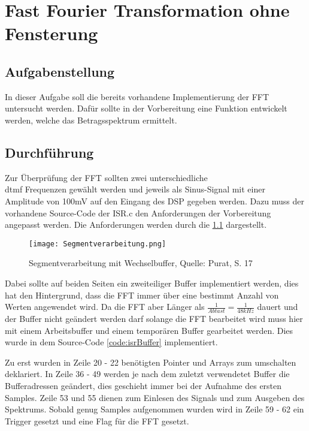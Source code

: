 \chapter{Fast Fourier Transformation ohne Fensterung}\label{CFFToF}
\section{Aufgabenstellung}\label{TFFToF}
In dieser Aufgabe soll die bereits vorhandene Implementierung der FFT untersucht werden. Dafür sollte in der Vorbereitung eine Funktion entwickelt werden, welche das Betragsspektrum ermittelt.

\section{Durchführung}\label{DFFToF}
Zur Überprüfung der FFT sollten zwei unterschiedliche\\ \gls{dtmf} Frequenzen gewählt werden und jeweils als Sinus-Signal mit einer Amplitude von 100mV auf den Eingang des DSP gegeben werden.
Dazu muss der vorhandene Source-Code der ISR.c den Anforderungen der Vorbereitung angepasst werden.
Die Anforderungen werden durch die \cref{fig:BufferRequire} dargestellt.

\begin{figure}[H]
	\texttt{[image: Segmentverarbeitung.png]}
  \caption{Segmentverarbeitung mit Wechselbuffer, Quelle: Purat, S. 17}
  \label{fig:BufferRequire}
\end{figure}

Dabei sollte auf beiden Seiten ein zweiteiliger Buffer implementiert werden, dies hat den Hintergrund, dass die FFT immer über eine bestimmt Anzahl von Werten angewendet wird.
Da die FFT aber Länger als \begin{math}\frac{1}{Abtast} = \frac{1}{48 kHz}\end{math} dauert und der Buffer nicht geändert werden darf solange die FFT bearbeitet wird muss hier mit einem Arbeitsbuffer und einem temporären Buffer gearbeitet werden. Dies wurde in dem Source-Code \autoref{code:isrBuffer} implementiert.
\label{code:isrBuffer}

Zu erst wurden in Zeile 20 - 22 benötigten Pointer und Arrays zum umschalten deklariert.
In Zeile 36 - 49 werden je nach dem zuletzt verwendetet Buffer die Bufferadressen geändert, dies geschieht immer bei der Aufnahme des ersten Samples.
Zeile 53 und 55 dienen zum Einlesen des Signals und zum Ausgeben des Spektrums. Sobald genug Samples aufgenommen wurden wird in Zeile 59 - 62 ein Trigger gesetzt und eine Flag für die FFT gesetzt.

